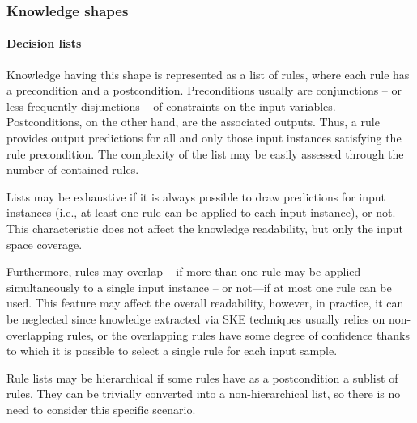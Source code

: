 \documentclass[sigconf]{acmart}
\begin{document}
\subsubsection{Knowledge shapes}

\paragraph{Decision lists}

Knowledge having this shape is represented as a list of rules, where each rule has a precondition and a postcondition.
%
Preconditions usually are conjunctions -- or less frequently disjunctions -- of constraints on the input variables.
%
Postconditions, on the other hand, are the associated outputs.
%
Thus, a rule provides output predictions for all and only those input instances satisfying the rule precondition.
%
The complexity of the list may be easily assessed through the number of contained rules.

Lists may be exhaustive if it is always possible to draw predictions for input instances (i.e., at least one rule can be applied to each input instance), or not.
%
This characteristic does not affect the knowledge readability, but only the input space coverage.

Furthermore, rules may overlap -- if more than one rule may be applied simultaneously to a single input instance -- or not---if at most one rule can be used.
%
This feature may affect the overall readability, however, in practice, it can be neglected since knowledge extracted via SKE techniques usually relies on non-overlapping rules, or the overlapping rules have some degree of confidence thanks to which it is possible to select a single rule for each input sample.

Rule lists may be hierarchical if some rules have as a postcondition a sublist of rules.
%
They can be trivially converted into a non-hierarchical list, so there is no need to consider this specific scenario.
\end{document}
